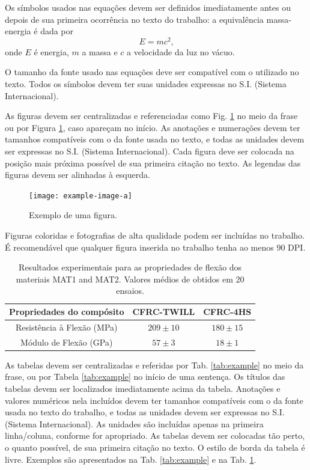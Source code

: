 \documentclass[
	article,			%
	10pt,				%
	oneside,			%
	a4paper,			%
  twocolumn,			%
	english,			%
	brazil,				%
	sumario=tradicional,
	]{abntex2}
\begin{document}
Os símbolos usados nas equações devem ser definidos imediatamente antes ou depois de sua
primeira ocorrência no texto do trabalho: a equivalência massa-energia é dada por
\begin{equation}
  \label{eq:mass-energy}
  E = m c^2\mbox{,}
\end{equation}
onde $E$ é energia, $m$ a massa e $c$ a velocidade da luz no vácuo.

O tamanho da fonte usado nas equações deve ser compatível com o utilizado no texto. Todos
os símbolos devem ter suas unidades expressas no S.I. (Sistema Internacional).

As figuras devem ser centralizadas e referenciadas como Fig. \ref{fig:example} no meio da
frase ou por Figura \ref{fig:example}, caso apareçam no início. As anotações e numerações
devem ter tamanhos compatíveis com o da fonte usada no texto, e todas as unidades devem
ser expressas no S.I. (Sistema Internacional). Cada figura deve ser colocada na posição
mais próxima possível de sua primeira citação no texto. As legendas das figuras devem ser
alinhadas à esquerda.

\begin{figure}[h]
  \begin{center}
    \texttt{[image: example-image-a]}
  \end{center}
  \caption{Exemplo de uma figura.}
  \label{fig:example}
\end{figure}

Figuras coloridas e fotografias de alta qualidade podem ser incluídas no trabalho. É
recomendável que qualquer figura inserida no trabalho tenha ao menos 90 DPI.

\begin{table}[t]
  \caption{Resultados experimentais para as propriedades de flexão dos materiais MAT1 and
  MAT2. Valores médios de obtidos em 20 ensaios.}
  \label{tab:large}
  \centering
  \begin{tabular}{ccc}
    \toprule
    Propriedades do compósito & CFRC-TWILL & CFRC-4HS \\
    \midrule
    Resistência à Flexão (MPa) & $209\pm10$ & $180\pm15$ \\
    Módulo de Flexão (GPa) & $57\pm3$ & $18\pm1$ \\
    \bottomrule
  \end{tabular}
\end{table}

As tabelas devem ser centralizadas e referidas por Tab. \ref{tab:example} no meio da
frase, ou por Tabela \ref{tab:example} no início de uma sentença. Os títulos das tabelas
devem ser localizados imediatamente acima da tabela. Anotações e valores numéricos nela
incluídos devem ter tamanhos compatíveis com o da fonte usada no texto do trabalho, e
todas as unidades devem ser expressas no S.I. (Sistema Internacional). As unidades são
incluídas apenas na primeira linha/coluna, conforme for apropriado. As tabelas devem ser
colocadas tão perto, o quanto possível, de sua primeira citação no texto. O estilo de
borda da tabela é livre. Exemplos são apresentados na Tab. \ref{tab:example} e na Tab.
\ref{tab:large}.
\end{document}
